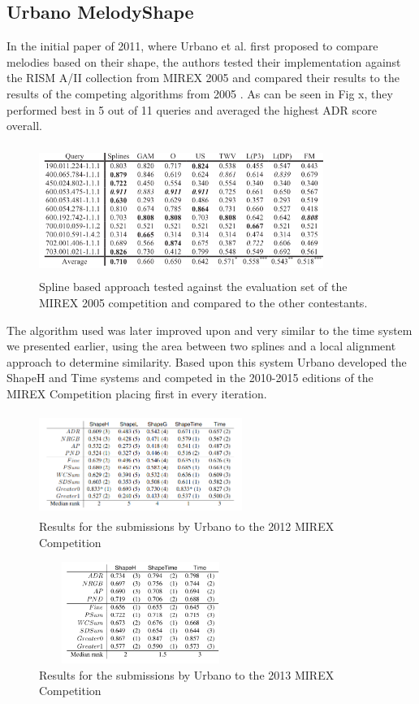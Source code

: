 \documentclass{llncs}
\begin{document}
\subsection{Urbano MelodyShape}
            In the initial paper of 2011, where Urbano et al. first proposed to compare melodies based on their shape, the authors tested their implementation against the RISM A/II collection from MIREX 2005 and compared their results to the results of the competing algorithms from 2005 \cite{five_point_five}. As can be seen in Fig x, they performed best in 5 out of 11 queries and averaged the highest ADR score overall. 
        \begin{figure}[h!]
			\centering
            \includegraphics[width=350px,height=160px,keepaspectratio]{one_of_five_point_five}
			\caption{Spline based approach tested against the evaluation set of the MIREX 2005 competition and compared to the other contestants. \cite{five_point_five}}
        \end{figure}
            The algorithm used was later improved upon and very similar to the time system we presented earlier, using the area between two splines and a local alignment approach to determine similarity. Based upon this system Urbano developed the ShapeH and Time systems  and competed in the 2010-2015 editions of the MIREX Competition placing first in every iteration. 
        \begin{figure}[h!]
			\centering
            \includegraphics[width=250px,height=125px,keepaspectratio]{urbano_mirex_2012_results}
			\caption{Results for the submissions by Urbano to the 2012 MIREX Competition \cite{five_point_four}}
        \end{figure}
        \begin{figure}[h!]
			\centering
            \includegraphics[width=250px,height=125px,keepaspectratio]{urbano_mirex_2013_results}
			\caption{Results for the submissions by Urbano to the 2013 MIREX Competition \cite{five_point_three}}
        \end{figure}
\end{document}
